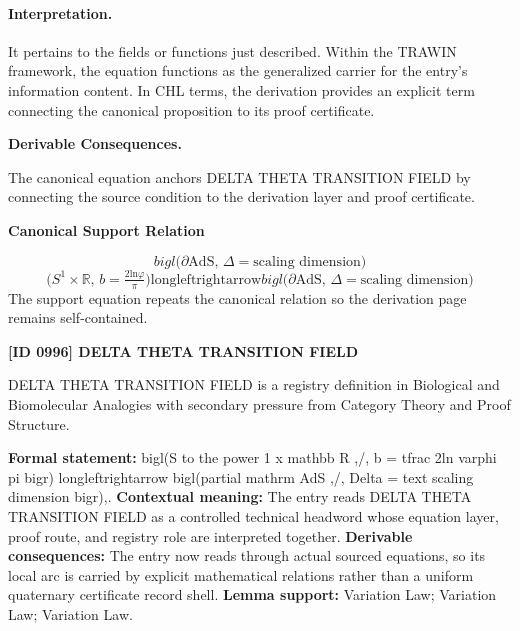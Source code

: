 \paragraph{Interpretation.}
It pertains to the fields or functions just described. Within the TRAWIN framework, the equation functions as the generalized carrier for the entry’s information content. In CHL terms, the derivation provides an explicit term connecting the canonical proposition to its proof certificate.

\par\vspace{0.35em}
\noindent\textbf{Derivable Consequences.}\quad
\begingroup
\footnotesize
\raggedright
The canonical equation anchors DELTA THETA TRANSITION FIELD by connecting the source condition to the derivation layer and proof certificate.
\par\endgroup

\noindent\textbf{Canonical Support Relation}\par
\[
bigl(\partial \mathrm{AdS},\, \Delta = \text{scaling dimension} \bigr)
\]
\[
\bigl(S^{1} \times \mathbb{R},\, b = \tfrac{2\mathrm{ln} \varphi}{\pi} \bigr) \mathrm{longleftrightarrow} bigl(\partial \mathrm{AdS},\, \Delta = \text{scaling dimension} \bigr)
\]
\noindent The support equation repeats the canonical relation so the derivation page remains self-contained.\par

\clearpage
\noindent\textbf{[ID 0996] DELTA THETA TRANSITION FIELD}\par
\vspace{0.35em}
\begingroup\small
{}
DELTA THETA TRANSITION FIELD is a registry definition in Biological and Biomolecular Analogies with secondary pressure from Category Theory and Proof Structure.

\begingroup\footnotesize\setlength{\emergencystretch}{3em}\sloppy
\textbf{Formal statement:} bigl(S to the power 1 x mathbb R ,/, b = tfrac 2ln varphi pi bigr) longleftrightarrow bigl(partial mathrm AdS ,/, Delta = text scaling dimension bigr),. \textbf{Contextual meaning:} The entry reads DELTA THETA TRANSITION FIELD as a controlled technical headword whose equation layer, proof route, and registry role are interpreted together. \textbf{Derivable consequences:} The entry now reads through actual sourced equations, so its local arc is carried by explicit mathematical relations rather than a uniform quaternary certificate record shell. \textbf{Lemma support:} Variation Law; Variation Law; Variation Law.\par
\endgroup

